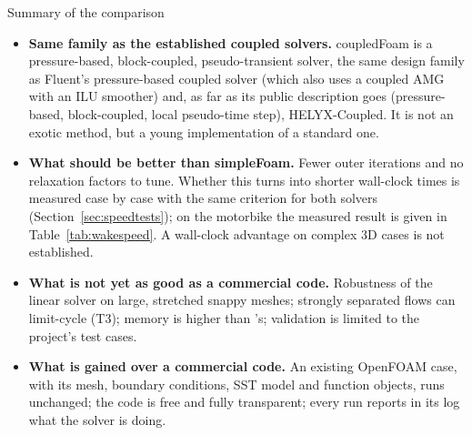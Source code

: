 \begin{cmpsummarybox}{Summary of the comparison}
\begin{itemize}
\item \textbf{Same family as the established coupled solvers.} coupledFoam is a
  pressure-based, block-coupled, pseudo-transient solver, the same
  design family as Fluent's pressure-based coupled solver (which also uses
  a coupled AMG with an ILU smoother) and, as far as its public
  description goes (pressure-based, block-coupled, local pseudo-time
  step), HELYX-Coupled. It is not an exotic method, but a young
  implementation of a standard one.
\item \textbf{What should be better than simpleFoam.} Fewer outer
  iterations and no relaxation factors to tune. Whether this turns into
  shorter wall-clock times is measured case by case with the same
  criterion for both solvers (Section~\ref{sec:speedtests}); on the
  motorbike the measured result is given in Table~\ref{tab:wakespeed}. A
  wall-clock advantage on complex 3D cases is not established.
\item \textbf{What is not yet as good as a commercial code.} Robustness of
  the linear solver on large, stretched snappy meshes; strongly separated
  flows can limit-cycle (T3); memory is higher than 's;
  validation is limited to the project's test cases.
\item \textbf{What is gained over a commercial code.} An existing OpenFOAM
  case, with its mesh, boundary conditions, SST model and function
  objects, runs unchanged; the code is free and fully transparent; every
  run reports in its log what the solver is doing.
\end{itemize}
\end{cmpsummarybox}
